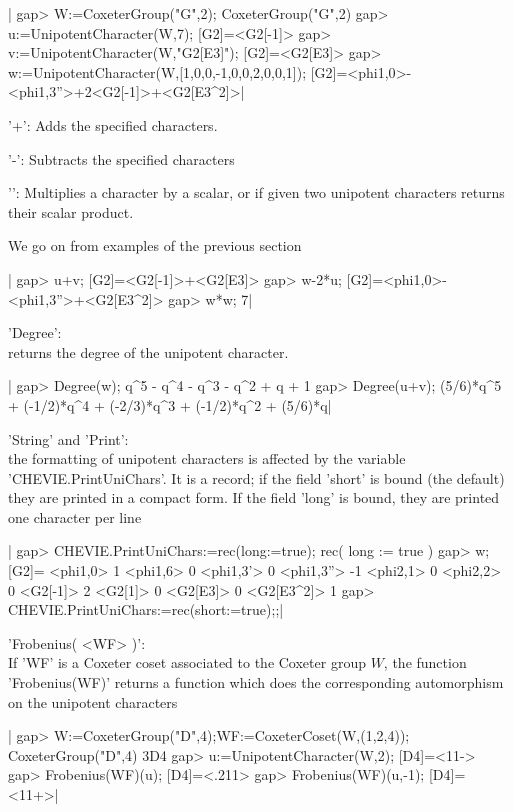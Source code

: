 |    gap> W:=CoxeterGroup("G",2);
    CoxeterGroup("G",2)
    gap> u:=UnipotentCharacter(W,7);
    [G2]=<G2[-1]>
    gap> v:=UnipotentCharacter(W,"G2[E3]");
    [G2]=<G2[E3]>
    gap> w:=UnipotentCharacter(W,[1,0,0,-1,0,0,2,0,0,1]);
    [G2]=<phi{1,0}>-<phi{1,3}''>+2<G2[-1]>+<G2[E3^2]>|


'+': Adds the specified characters.

'-': Subtracts the specified characters

'\*': Multiplies a character by a scalar, or if given two unipotent characters
returns their scalar product.

We go on from examples of the previous section\:

|    gap> u+v;
    [G2]=<G2[-1]>+<G2[E3]>
    gap> w-2*u;
    [G2]=<phi{1,0}>-<phi{1,3}''>+<G2[E3^2]>
    gap> w*w;
    7|

'Degree':\\ returns the degree of the unipotent character.

|    gap> Degree(w);
    q^5 - q^4 - q^3 - q^2 + q + 1
    gap> Degree(u+v);
    (5/6)*q^5 + (-1/2)*q^4 + (-2/3)*q^3 + (-1/2)*q^2 + (5/6)*q|

'String' and 'Print':\\ the formatting of unipotent characters is affected
  by  the variable  'CHEVIE.PrintUniChars'. It  is a  record; if  the field
  'short' is bound (the default) they are printed in a compact form. If the
  field 'long' is bound, they are printed one character per line\:

|    gap> CHEVIE.PrintUniChars:=rec(long:=true);
    rec(
      long := true )
    gap> w;
    [G2]=
    <phi{1,0}>   1
    <phi{1,6}>   0
    <phi{1,3}'>  0
    <phi{1,3}''> -1
    <phi{2,1}>   0
    <phi{2,2}>   0
    <G2[-1]>     2
    <G2[1]>      0
    <G2[E3]>     0
    <G2[E3^2]>   1
    gap> CHEVIE.PrintUniChars:=rec(short:=true);;|

'Frobenius( <WF> )':\\ If 'WF' is a Coxeter coset associated to the Coxeter
group  $W$, the function 'Frobenius(WF)' returns  a function which does the
corresponding automorphism on the unipotent characters

|    gap> W:=CoxeterGroup("D",4);WF:=CoxeterCoset(W,(1,2,4));
    CoxeterGroup("D",4)
    3D4
    gap> u:=UnipotentCharacter(W,2);
    [D4]=<11->
    gap> Frobenius(WF)(u);
    [D4]=<.211>
    gap> Frobenius(WF)(u,-1);
    [D4]=<11+>|

